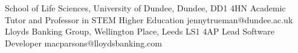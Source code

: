  
 	
 
	\begin{ReferenceEntries}%
		{School of Life Sciences, University of Dundee, Dundee, DD1 4HN}%
		{Academic Tutor and Professor in STEM Higher Education}%
		{jennytrueman@dundee.ac.uk}%
		{Lloyds Banking Group, Wellington Place, Leeds LS1 4AP}%
		{Lead Software Developer}%
		{macparsons@lloydsbanking.com}%
	\end{ReferenceEntries}%
	 
